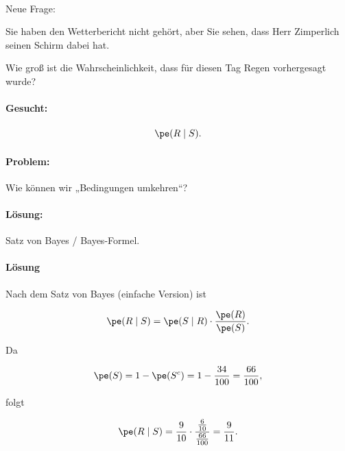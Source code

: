 \begin{bsp}  \\
Neue Frage:

    Sie haben den Wetterbericht nicht gehört, aber Sie sehen, dass Herr Zimperlich seinen Schirm dabei hat.

    Wie groß ist die Wahrscheinlichkeit, dass für diesen Tag Regen vorhergesagt wurde?

    \paragraph{Gesucht:}

    \[
        \pe(R\mid S).
    \]

    \paragraph{Problem:} Wie können wir „Bedingungen umkehren“?

    \paragraph{Lösung:} Satz von Bayes / Bayes-Formel.

    \paragraph{Lösung}

    Nach dem Satz von Bayes (einfache Version) ist

    \[
        \pe(R\mid S)
        =
        \pe(S\mid R)\cdot \frac{\pe(R)}{\pe(S)}.
    \]

    Da

    \[
        \pe(S)=1-\pe(S^c)=1-\frac{34}{100}=\frac{66}{100},
    \]

    folgt

    \[
        \pe(R\mid S)
        =
        \frac{9}{10}\cdot
        \frac{\frac{6}{10}}{\frac{66}{100}}
        =
        \frac{9}{11}.
    \]
\end{bsp}

